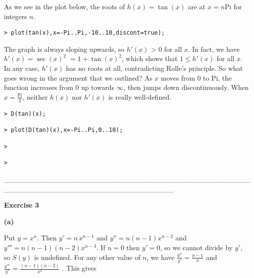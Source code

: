 \documentclass{article}
\begin{document}
\begin{Maple Normal}
As we see in the plot below, the roots of 
$h (x)=\tan (x)$ are at 
$x =n \mathrm{Pi}$ for integers 
$n $.
\end{Maple Normal}
\begin{lstlisting}
> plot(tan(x),x=-Pi..Pi,-10..10,discont=true);
\end{lstlisting}
\begin{Maple Normal}
The graph is always sloping upwards, so 
$\mathit{h'} (x)$ > 0 for all 
$x $.  In fact, we have 
$\mathit{h'} (x)=\sec (x)^{2}$
$=1+\tan (x)^{2}$, which shows that 
$1\le \mathit{h'} (x)$ for all 
$x $.  In any case, 
$\mathit{h'} (x)$ has no roots at all, contradicting Rolle's principle.  So what goes wrong in the argument that we outlined?  As 
$x $ moves from 
$0$ to 
$\mathrm{Pi}$, the function increases from 
$0$ up towards 
$\infty $, then jumps down discontinuously.   When 
$x =\frac{\mathrm{Pi}}{2}$, neither 
$h (x)$ nor 
$\mathit{h'} (x)$ is really well-defined.
\end{Maple Normal}
\begin{lstlisting}
> D(tan)(x);
\end{lstlisting}
\begin{lstlisting}
> plot(D(tan)(x),x=-Pi..Pi,0..10);
\end{lstlisting}
\begin{lstlisting}
> 
\end{lstlisting}
\begin{lstlisting}
> 
\end{lstlisting}
\begin{Maple Normal}
\_\_\_\_\_\_\_\_\_\_\_\_\_\_\_\_\_\_\_\_\_\_\_\_\_\_\_\_\_\_\_\_\_\_\_\_\_\_\_\_\_\_\_\_\_\_\_\_\_\_\_\_\_\_\_\_\_\_\_\_\_\_\_\_\_\_\_\_\_\_\_\_\_\_\_\_\_\_\_\_\_
\end{Maple Normal}
\begin{Maple Normal}
\textbf{Exercise 3}
\end{Maple Normal}
\begin{Maple Normal}
\textbf{(a)}
\end{Maple Normal}
\begin{Maple Normal}
Put 
$y =x^{n}$.  Then 
$\mathit{y'} =n \,x^{n -1}$ and 
$\mathit{y''} =n (n -1) x^{n -2}$ and 
$\mathit{y'''} =n (n -1) (n -2) x^{n -3}$.  If 
$n =0$ then 
$\mathit{y'} =0$, so we cannot divide by 
$\mathit{y'} $, so 
$S (y)$ is undefined.  For any other value of 
$n $, we have  
$\frac{\mathit{y''}}{\mathit{y'}}=\frac{n -1}{x}$ and  
$\frac{\mathit{y'''}}{\mathit{y'}}=\frac{(n -1) (n -2)}{x^{2}}$  .  This gives
\end{Maple Normal}
\end{document}
